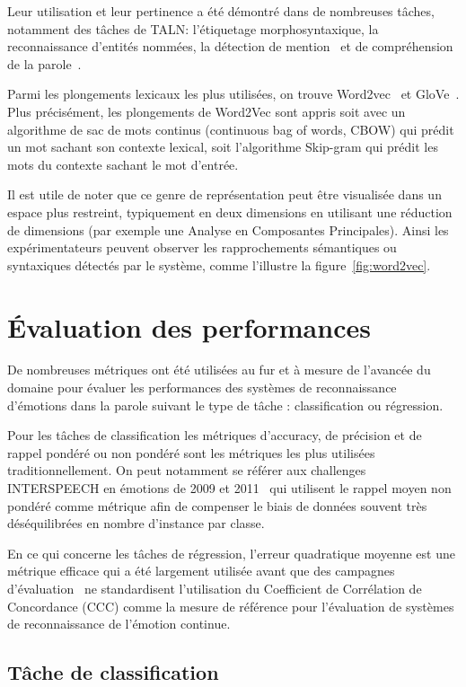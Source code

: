 Leur utilisation et leur pertinence a été démontré dans de nombreuses tâches, notamment des tâches de TALN: l’étiquetage morphosyntaxique, la reconnaissance d’entités nommées, la détection de mention~\cite{Turian2010,Bansal2014} et de compréhension de la parole~\cite{Mesnil2013,Yao2014,Liu2016}.

Parmi les plongements lexicaux les plus utilisées, on trouve Word2vec~\cite{word2vec} et GloVe~\cite{Pennington2014}.
Plus précisément, les plongements de Word2Vec sont appris soit avec un algorithme de sac de mots continus (continuous bag of words, CBOW) qui prédit un mot sachant son contexte lexical, soit l'algorithme Skip-gram qui prédit les mots du contexte sachant le mot d'entrée.

Il est utile de noter que ce genre de représentation peut être visualisée dans un espace plus restreint, typiquement en deux dimensions en utilisant une réduction de dimensions (par exemple une Analyse en Composantes Principales). Ainsi les expérimentateurs peuvent observer les rapprochements sémantiques ou syntaxiques détectés par le système, comme l'illustre la figure~\ref{fig:word2vec}.

\section{Évaluation des performances}
De nombreuses métriques ont été utilisées au fur et à mesure de l'avancée du domaine pour évaluer les performances des systèmes de reconnaissance d'émotions dans la parole suivant le type de tâche : classification ou régression.

Pour les tâches de classification les métriques d'accuracy, de précision et de rappel pondéré ou non pondéré sont les métriques les plus utilisées traditionnellement. On peut notamment se référer aux challenges INTERSPEECH en émotions de 2009 et 2011~\cite{Schuller2009,Schuller2011} qui utilisent le rappel moyen non pondéré comme métrique afin de compenser le biais de données souvent très déséquilibrées en nombre d'instance par classe.

En ce qui concerne les tâches de régression, l'erreur quadratique moyenne est une métrique efficace qui a été largement utilisée avant que des campagnes d'évaluation~\cite{AVEC2017} ne standardisent l'utilisation du Coefficient de Corrélation de Concordance (CCC) comme la mesure de référence pour l'évaluation de systèmes de reconnaissance de l'émotion continue.

\subsection{Tâche de classification}

